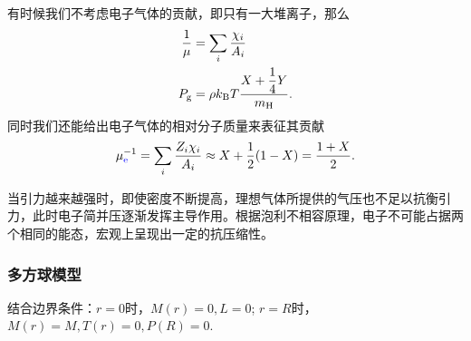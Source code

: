 \documentclass[../天体物理基础.tex]{subfiles}
\begin{document}
有时候我们不考虑电子气体的贡献，即只有一大堆离子，那么
\begin{align}
\frac{1}{\mu}&=\sum_{i}\frac{\chi_{i}}{A_{i}}\\
P_{\text{g}}&=\rho k_{\text{B}}T\frac{X+\dfrac{1}{4}Y}{m_{\ce{H}}}.
\end{align}
同时我们还能给出电子气体的相对分子质量来表征其贡献
\begin{equation}
\mu_{{\color{blue}{\ce{e}}}}^{-1}=\sum_{i}\frac{Z_{i}\chi_{i}}{A_{i}}\approx X+\frac{1}{2}(1-X)=\frac{1+X}{2}.
\end{equation}

当引力越来越强时，即使密度不断提高，理想气体所提供的气压也不足以抗衡引力，此时电子简并压逐渐发挥主导作用。根据泡利不相容原理，电子不可能占据两个相同的能态，宏观上呈现出一定的抗压缩性。

\subsubsection{多方球模型}
结合边界条件：$r=0$时，$M\left(r\right)=0,L=0$; $r=R$时，$M\left(r\right)=M,T\left(r\right)=0,P\left(R\right)=0$.
\end{document}
